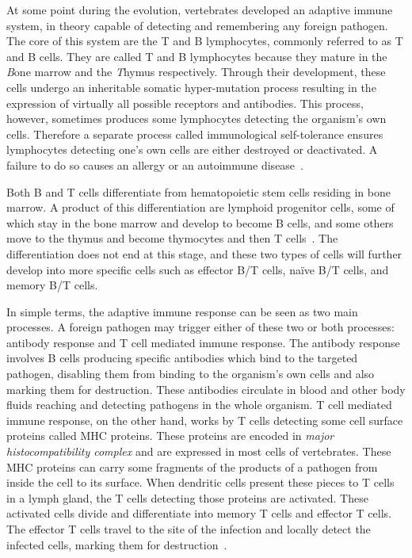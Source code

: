 At some point during the evolution, vertebrates developed an adaptive immune system, in theory capable of detecting and remembering any foreign pathogen. The core of this system are the T and B lymphocytes, commonly referred to as T and B cells. They are called T and B lymphocytes because they mature in the \emph{B}one marrow and the \emph{T}hymus respectively. Through their development, these cells undergo an inheritable somatic hyper-mutation process resulting in the expression of virtually all possible receptors and antibodies. This process, however, sometimes produces some lymphocytes detecting the organism's own cells. Therefore a separate process called immunological self-tolerance ensures lymphocytes detecting one's own cells are either destroyed or deactivated. A failure to do so causes an allergy or an autoimmune disease~\cite[Ch. 24]{the-cell}.

Both B and T cells differentiate from hematopoietic stem cells residing in bone marrow. A product of this differentiation are lymphoid progenitor cells, some of which stay in the bone marrow and develop to become B cells, and some others move to the thymus and become thymocytes and then T cells~\cite[Ch. 24]{the-cell}. The differentiation does not end at this stage, and these two types of cells will further develop into more specific cells such as effector B/T cells, na\"ive B/T cells, and memory B/T cells.

In simple terms, the adaptive immune response can be seen as two main processes. A foreign pathogen may trigger either of these two or both processes: antibody response and T cell mediated immune response. The antibody response involves B cells producing specific antibodies which bind to the targeted pathogen, disabling them from binding to the organism's own cells and also marking them for destruction. These antibodies circulate in blood and other body fluids reaching and detecting pathogens in the whole organism. T cell mediated immune response, on the other hand, works by T cells detecting some cell surface proteins called MHC proteins. These proteins are encoded in \emph{major histocompatibility complex} and are expressed in most cells of vertebrates. These MHC proteins can carry some fragments of the products of a pathogen from inside the cell to its surface. When dendritic cells present these pieces to T cells in a lymph gland, the T cells detecting those proteins are activated. These activated cells divide and differentiate into memory T cells and effector T cells. The effector T cells travel to the site of the infection and locally detect the infected cells, marking them for destruction~\cite[Ch. 24]{the-cell}.

